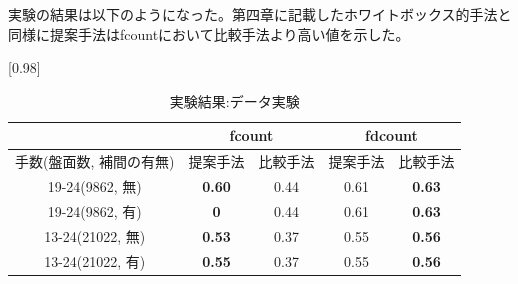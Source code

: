 実験の結果は以下のようになった。第四章に記載したホワイトボックス的手法と同様に提案手法はfcountにおいて比較手法より高い値を示した。
\begin{table}[H]
	\caption{実験結果:データ実験}
	\centering
	\scalebox{0.98}[0.98]{
		\begin{tabular}{c|c|c|c|c}
			\multicolumn{1}{c}{} & \multicolumn{2}{|c|}{fcount} 
			& \multicolumn{2}{c|}{fdcount}\\ \hline \hline
			手数(盤面数, 補間の有無)    & 提案手法 & 比較手法 & 提案手法 & 比較手法 \\ \hline
			19-24(9862, 無)    & \bf{0.60} & 0.44 & 0.61 & \bf{0.63} \\
			19-24(9862, 有)    & \bf{0} & 0.44 & 0.61 & \bf{0.63}  \\
			13-24(21022, 無)   & \bf{0.53} & 0.37 & 0.55 & \bf{0.56}  \\
			13-24(21022, 有)   & \bf{0.55} & 0.37 & 0.55 & \bf{0.56}  \\
		\end{tabular}
	}
	\label{table:result-online}
\end{table}
